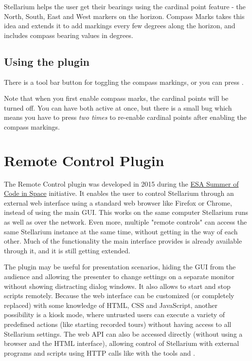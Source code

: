 
Stellarium helps the user get their bearings using the cardinal point
feature - the North, South, East and West markers on the horizon.
Compass Marks takes this idea and extends it to add markings every few
degrees along the horizon, and includes compass bearing values in
degrees.

\subsection{Using the plugin}
\label{sec:plugins:CompassMarks:using}

There is a tool bar button for toggling the compass markings, or you can
press .

Note that when you first enable compass marks, the cardinal points will
be turned off. You can have both active at once, but there is a small
bug which means you have to press  \emph{two times} to
re-enable cardinal points after enabling the compass markings.

\newpage
\section{Remote Control Plugin}
\label{sec:plugins:RemoteControl}

The Remote Control plugin was developed in 2015 during the 
\href{http://sophia.estec.esa.int/socis/}{ESA Summer of Code in Space} 
initiative. It enables the user to control Stellarium through an external web 
interface using a standard web browser like Firefox or Chrome, instead of using 
the main GUI. This works on the same computer Stellarium runs as well as over 
the network. Even more, multiple "remote controls" can access the same 
Stellarium instance at the same time, without getting in the way of each other. 
Much of the functionality the main interface provides is already available 
through it, and it is still getting extended.

The plugin may be useful for presentation scenarios, hiding the GUI from the 
audience and allowing the presenter to change settings on a separate monitor 
without showing distracting dialog windows. It also allows to start and stop 
scripts remotely. Because the web interface can be customized (or completely 
replaced) with some knowledge of HTML, CSS and JavaScript, another possibility 
is a kiosk mode, where untrusted users can execute a variety of predefined 
actions (like starting recorded tours) without having access to all Stellarium 
settings. The web API can also be accessed directly (without using a browser 
and the HTML interface), allowing control of Stellarium with external programs 
and scripts using HTTP calls like with the tools  and .


